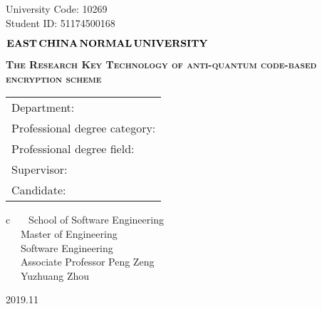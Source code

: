 \newpage

\pagestyle{empty}


\hspace*{\fill} {\large University Code: 10269}\\
\hspace*{\fill} {\large Student ID: 51174500168}

\vskip 2cm


\begin{center}
	{\Huge $ \bf{EAST}\,\bf{CHINA}\,\bf{NORMAL}\,
		\bf{UNIVERSITY}$}
\end{center}

\vskip 3cm

\begin{center}
\bfseries{\scshape{\huge The Research Key Technology of anti-quantum code-based encryption scheme}}\\
\end{center}

\vskip 2cm {\large
\begin{center}
\begin{tabular}{l}
Department:\\
Professional degree category:\\
Professional degree field:\\
Supervisor:\\
Candidate:
\end{tabular}
\begin{tabular}c
~~~School of Software Engineering       \\
\hline ~~~Master of Engineering    \\
\hline ~~~Software Engineering\\
\hline ~~~Associate Professor Peng Zeng\\
\hline ~~~Yuzhuang Zhou\\
\hline
\end{tabular}
\end{center}}

\vskip 30mm

\begin{center}
{\Large 2019.11}
\end{center}